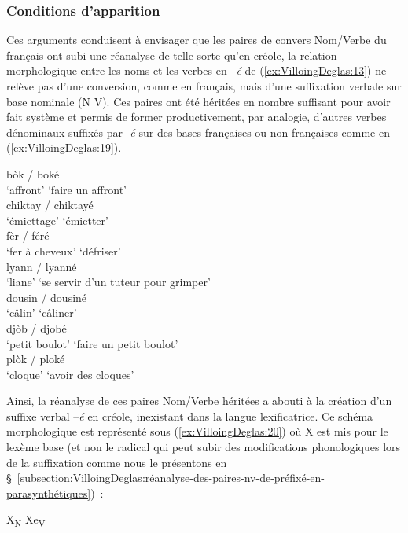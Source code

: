 \documentclass[output=paper]{langsci/langscibook}
\begin{document}
\subsubsection{Conditions d'apparition}\label{subsubsection:VilloingDeglas:conditions-dapparition}

Ces arguments conduisent à envisager que les paires de convers Nom/Verbe
du français ont subi une réanalyse de telle sorte qu'en créole, la
relation morphologique entre les noms et les verbes en --\emph{é} de
(\ref{ex:VilloingDeglas:13}) ne relève pas d'une conversion, comme en français, mais d'une
suffixation verbale sur base nominale (N\textrightarrow{} V). Ces paires ont été héritées
en nombre suffisant pour avoir fait système et permis de former
productivement, par analogie, d'autres verbes dénominaux suffixés par
-\emph{é} sur des bases françaises ou non françaises comme en (\ref{ex:VilloingDeglas:19}).

\ea \label{ex:VilloingDeglas:19}
  \ea \gll bòk / boké\\
  {`affront'} {} {`faire un affront'}\\
  \ex \gll chiktay / chiktayé\\
  {`émiettage'} {} {`émietter'}\\
  \ex \gll fèr / féré\\
  {`fer à cheveux'} {} {`défriser'}\\
  \ex \gll lyann / lyanné\\
  {`liane'} {} {`se servir d'un tuteur pour grimper'}\\
  \ex \gll dousin / dousiné\\
  {`câlin'} {} {`câliner'}\\
  \ex \gll djòb / djobé\\
  {`petit boulot'} {} {`faire un petit boulot'}\\
  \ex \gll plòk / ploké\\
  {`cloque'} {} {`avoir des cloques'}\\
\z\z


Ainsi, la réanalyse de ces paires Nom/Verbe héritées a abouti à la
création d'un suffixe verbal --\emph{é} en créole, inexistant dans la
langue lexificatrice. Ce schéma morphologique est représenté sous (\ref{ex:VilloingDeglas:20})
où X est mis pour le lexème base (et non le radical qui peut subir des
modifications phonologiques lors de la suffixation comme nous le
présentons en §~\ref{subsection:VilloingDeglas:réanalyse-des-paires-nv-de-préfixé-en-parasynthétiques})~:

\ea \label{ex:VilloingDeglas:20} X\textsubscript{N} \textrightarrow{} Xe\textsubscript{V}
\z
\end{document}
